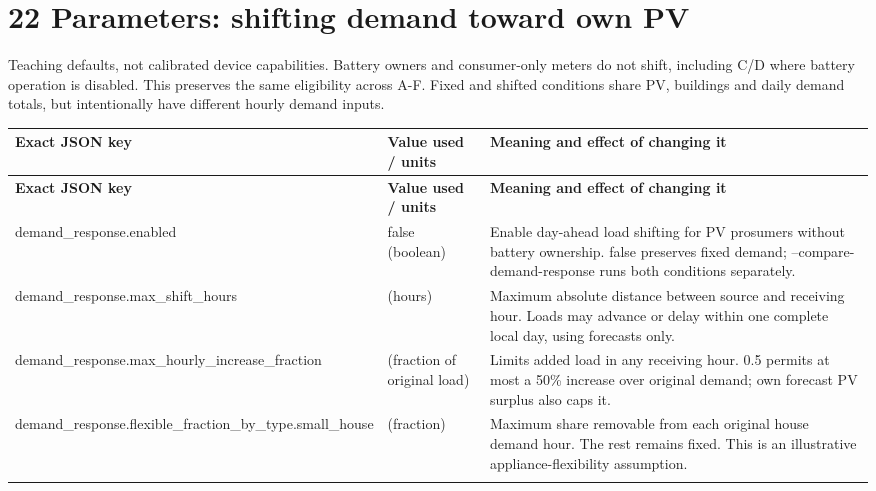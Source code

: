\documentclass[a4paper,11pt]{article}
\begin{document}
\section*{22  Parameters: shifting demand toward own PV}
\par\medskip

Teaching defaults, not calibrated device capabilities. Battery owners and consumer-only meters do not shift, including C/D where battery operation is disabled. This preserves the same eligibility across A-F. Fixed and shifted conditions share PV, buildings and daily demand totals, but intentionally have different hourly demand inputs.
\par\medskip

\begingroup\small
\begin{longtable}{>{\RaggedRight\arraybackslash}p{}>{\RaggedRight\arraybackslash}p{}>{\RaggedRight\arraybackslash}p{}}
\toprule
\textbf{Exact JSON key} & \textbf{Value used / units} & \textbf{Meaning and effect of changing it} \\ \midrule
\endfirsthead
\toprule
\textbf{Exact JSON key} & \textbf{Value used / units} & \textbf{Meaning and effect of changing it} \\ \midrule
\endhead
demand\_\allowbreak{}response.\allowbreak{}enabled & false (boolean) & Enable day-ahead load shifting for PV prosumers without battery ownership. false preserves fixed demand; --compare-demand-response runs both conditions separately. \\ \addlinespace[3pt]
demand\_\allowbreak{}response.\allowbreak{}max\_\allowbreak{}shift\_\allowbreak{}hours & 6 (hours) & Maximum absolute distance between source and receiving hour. Loads may advance or delay within one complete local day, using forecasts only. \\ \addlinespace[3pt]
demand\_\allowbreak{}response.\allowbreak{}max\_\allowbreak{}hourly\_\allowbreak{}increase\_\allowbreak{}fraction & 0.5 (fraction of original load) & Limits added load in any receiving hour. 0.5 permits at most a 50\% increase over original demand; own forecast PV surplus also caps it. \\ \addlinespace[3pt]
demand\_\allowbreak{}response.\allowbreak{}flexible\_\allowbreak{}fraction\_\allowbreak{}by\_\allowbreak{}type.\allowbreak{}small\_\allowbreak{}house & 0.2 (fraction) & Maximum share removable from each original house demand hour. The rest remains fixed. This is an illustrative appliance-flexibility assumption. \\ \addlinespace[3pt]

\end{longtable}
\end{document}
